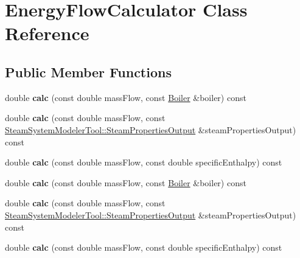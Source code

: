 \hypertarget{class_energy_flow_calculator}{}\section{Energy\+Flow\+Calculator Class Reference}
\label{class_energy_flow_calculator}
\subsection*{Public Member Functions}
\begin{DoxyCompactItemize}
\item 
\mbox{\label{class_energy_flow_calculator_a07bdd911e1e2ccb8fbf464dd8a9f5ed7}} 
double {\bfseries calc} (const double mass\+Flow, const \hyperlink{class_boiler}{Boiler} \&boiler) const
\item 
\mbox{\label{class_energy_flow_calculator_a4a2fe600ab51c4ea0bdd5b6561c36387}} 
double {\bfseries calc} (const double mass\+Flow, const \hyperlink{struct_steam_system_modeler_tool_1_1_steam_properties_output}{Steam\+System\+Modeler\+Tool\+::\+Steam\+Properties\+Output} \&steam\+Properties\+Output) const
\item 
\mbox{\label{class_energy_flow_calculator_a7963289a05637035bf3f7a2d6b3e5b4f}} 
double {\bfseries calc} (const double mass\+Flow, const double specific\+Enthalpy) const
\item 
\mbox{\label{class_energy_flow_calculator_a07bdd911e1e2ccb8fbf464dd8a9f5ed7}} 
double {\bfseries calc} (const double mass\+Flow, const \hyperlink{class_boiler}{Boiler} \&boiler) const
\item 
\mbox{\label{class_energy_flow_calculator_a4a2fe600ab51c4ea0bdd5b6561c36387}} 
double {\bfseries calc} (const double mass\+Flow, const \hyperlink{struct_steam_system_modeler_tool_1_1_steam_properties_output}{Steam\+System\+Modeler\+Tool\+::\+Steam\+Properties\+Output} \&steam\+Properties\+Output) const
\item 
\mbox{\label{class_energy_flow_calculator_a7963289a05637035bf3f7a2d6b3e5b4f}} 
double {\bfseries calc} (const double mass\+Flow, const double specific\+Enthalpy) const

\end{DoxyCompactItemize}
